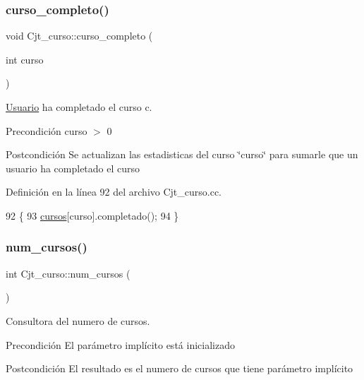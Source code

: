 \subsubsection{\texorpdfstring{curso\+\_\+completo()}{curso\_completo()}}
{\footnotesize\ttfamily void Cjt\+\_\+curso\+::curso\+\_\+completo (\begin{DoxyParamCaption}\item[{int}]{curso }\end{DoxyParamCaption})}



\mbox{\hyperlink{class_usuario}{Usuario}} ha completado el curso c. 

\begin{DoxyPrecond}{Precondición}
curso $>$ 0 
\end{DoxyPrecond}
\begin{DoxyPostcond}{Postcondición}
Se actualizan las estadisticas del curso \char`\"{}curso\char`\"{} para sumarle que un usuario ha completado el curso 
\end{DoxyPostcond}


Definición en la línea 92 del archivo Cjt\+\_\+curso.\+cc.


\begin{DoxyCode}
92                                         \{
93   \mbox{\hyperlink{class_cjt__curso_af8d4def315cf56b9aab3328bf80bb32c}{cursos}}[curso].completado();
94 \}
\end{DoxyCode}
\mbox{\label{class_cjt__curso_a1ad84838189a13e86741d96cf2107d9c}} 
\subsubsection{\texorpdfstring{num\+\_\+cursos()}{num\_cursos()}}
{\footnotesize\ttfamily int Cjt\+\_\+curso\+::num\+\_\+cursos (\begin{DoxyParamCaption}{ }\end{DoxyParamCaption})}



Consultora del numero de cursos. 

\begin{DoxyPrecond}{Precondición}
El parámetro implícito está inicializado 
\end{DoxyPrecond}
\begin{DoxyPostcond}{Postcondición}
El resultado es el numero de cursos que tiene parámetro implícito 
\end{DoxyPostcond}


